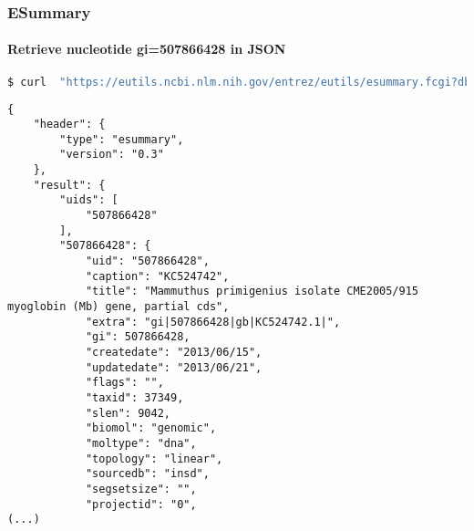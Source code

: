 \documentclass{beamer}
\begin{document}
\begin{frame}[fragile]
\frametitle{ESummary}
\framesubtitle{Retrieve nucleotide gi=507866428 in JSON}
\begin{lstlisting}[language=bash,basicstyle=\tiny,breaklines=true]
$ curl  "https://eutils.ncbi.nlm.nih.gov/entrez/eutils/esummary.fcgi?db=nucleotide&id=507866428&retmode=json"
\end{lstlisting}

\begin{lstlisting}[basicstyle=\tiny,breaklines=false]
{
    "header": {
        "type": "esummary",
        "version": "0.3"
    },
    "result": {
        "uids": [
            "507866428"
        ],
        "507866428": {
            "uid": "507866428",
            "caption": "KC524742",
            "title": "Mammuthus primigenius isolate CME2005/915 myoglobin (Mb) gene, partial cds",
            "extra": "gi|507866428|gb|KC524742.1|",
            "gi": 507866428,
            "createdate": "2013/06/15",
            "updatedate": "2013/06/21",
            "flags": "",
            "taxid": 37349,
            "slen": 9042,
            "biomol": "genomic",
            "moltype": "dna",
            "topology": "linear",
            "sourcedb": "insd",
            "segsetsize": "",
            "projectid": "0",
(...)
\end{lstlisting}
\end{frame}
\end{document}
